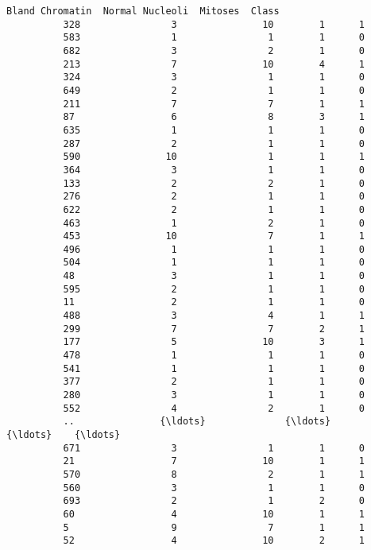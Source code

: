 \documentclass[11pt]{article}
\begin{document}
\begin{Verbatim}[commandchars=\\\{\}]
               Bland Chromatin  Normal Nucleoli  Mitoses  Class  
          328                3               10        1      1  
          583                1                1        1      0  
          682                3                2        1      0  
          213                7               10        4      1  
          324                3                1        1      0  
          649                2                1        1      0  
          211                7                7        1      1  
          87                 6                8        3      1  
          635                1                1        1      0  
          287                2                1        1      0  
          590               10                1        1      1  
          364                3                1        1      0  
          133                2                2        1      0  
          276                2                1        1      0  
          622                2                1        1      0  
          463                1                2        1      0  
          453               10                7        1      1  
          496                1                1        1      0  
          504                1                1        1      0  
          48                 3                1        1      0  
          595                2                1        1      0  
          11                 2                1        1      0  
          488                3                4        1      1  
          299                7                7        2      1  
          177                5               10        3      1  
          478                1                1        1      0  
          541                1                1        1      0  
          377                2                1        1      0  
          280                3                1        1      0  
          552                4                2        1      0  
          ..               {\ldots}              {\ldots}      {\ldots}    {\ldots}  
          671                3                1        1      0  
          21                 7               10        1      1  
          570                8                2        1      1  
          560                3                1        1      0  
          693                2                1        2      0  
          60                 4               10        1      1  
          5                  9                7        1      1  
          52                 4               10        2      1  

\end{Verbatim}
\end{document}
